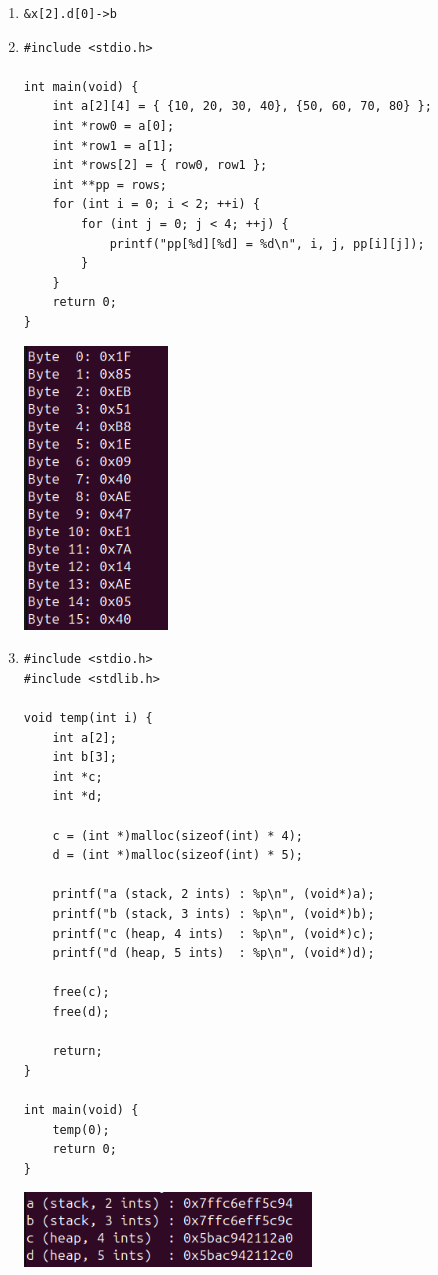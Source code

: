 \documentclass[12pt]{article}
\begin{document}
\begin{enumerate}
\begin{enumerate}[label=\arabic*)]
        \item \texttt{\&x[2].d[0]->b}
        \item \begin{verbatim}
#include <stdio.h>

int main(void) {
    int a[2][4] = { {10, 20, 30, 40}, {50, 60, 70, 80} };
    int *row0 = a[0];
    int *row1 = a[1];
    int *rows[2] = { row0, row1 };
    int **pp = rows;
    for (int i = 0; i < 2; ++i) {
        for (int j = 0; j < 4; ++j) {
            printf("pp[%d][%d] = %d\n", i, j, pp[i][j]);
        }
    }
    return 0;
}
\end{verbatim}
\includegraphics[width=0.3\textwidth]{image4.png}
        \item \begin{verbatim}
#include <stdio.h>
#include <stdlib.h>

void temp(int i) {
    int a[2];
    int b[3];
    int *c;
    int *d;

    c = (int *)malloc(sizeof(int) * 4);
    d = (int *)malloc(sizeof(int) * 5);

    printf("a (stack, 2 ints) : %p\n", (void*)a);
    printf("b (stack, 3 ints) : %p\n", (void*)b);
    printf("c (heap, 4 ints)  : %p\n", (void*)c);
    printf("d (heap, 5 ints)  : %p\n", (void*)d);

    free(c);
    free(d);

    return;
}

int main(void) {
    temp(0);
    return 0;
}

        \end{verbatim}
\includegraphics[width=0.6\textwidth]{image5.png}


\end{enumerate}
\end{enumerate}
\end{document}
